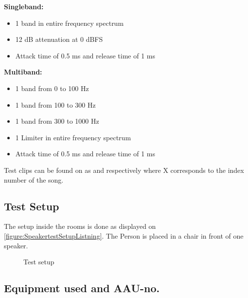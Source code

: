 \noindent\begin{minipage}[t]{0.5\linewidth}
    \textbf{Singleband:}
    \begin{itemize}
    \item 1 band in entire frequency spectrum
    \item 12 dB attenuation at 0 dBFS
    \item Attack time of 0.5 ms and release time of 1 ms
    \end{itemize}
    \end{minipage}%
    \begin{minipage}[t]{0.5\linewidth}
    \textbf{Multiband:}
    \begin{itemize}
    \item 1 band from 0 to 100 Hz
    \item 1 band from 100 to 300 Hz
    \item 1 band from 300 to 1000 Hz
    \item 1 Limiter in entire frequency spectrum
    \item Attack time of 0.5 ms and release time of 1 ms
    \end{itemize}
\end{minipage}\par\bigskip
Test clips can be found on  as  and  respectively where X corresponds to the index number of the song.



\subsection*{Test Setup}
The setup inside the rooms is done as displayed on \autoref{figure:SpeakertestSetupListning}. The Person is placed in a chair in front of one speaker.
\begin{figure}[H]
\centering
{}
\caption{Test setup}
\label{figure:SpeakertestSetupListning}
\end{figure}

\subsection*{Equipment used and AAU-no.}


